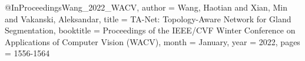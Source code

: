@InProceedings{Wang_2022_WACV,
    author    = {Wang, Haotian and Xian, Min and Vakanski, Aleksandar},
    title     = {TA-Net: Topology-Aware Network for Gland Segmentation},
    booktitle = {Proceedings of the IEEE/CVF Winter Conference on Applications of Computer Vision (WACV)},
    month     = {January},
    year      = {2022},
    pages     = {1556-1564}
}